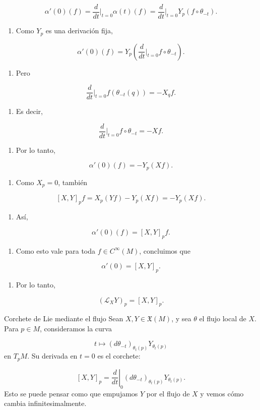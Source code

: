 \begin{bookproof}{}
\[
\alpha'(0)(f)=\frac{d}{dt}\bigg|_{t=0}\alpha(t)(f)=\frac{d}{dt}\bigg|_{t=0}Y_p(f\circ\theta_{-t}).
\]
\begin{enumerate}[start=33]
\item Como $Y_p$ es una derivación fija,
\end{enumerate}
\[
\alpha'(0)(f)=Y_p\left(\frac{d}{dt}\bigg|_{t=0}f\circ\theta_{-t}\right).
\]
\begin{enumerate}[start=34]
\item Pero
\end{enumerate}
\[
\frac{d}{dt}\bigg|_{t=0}f(\theta_{-t}(q))=-X_qf.
\]
\begin{enumerate}[start=35]
\item Es decir,
\end{enumerate}
\[
\frac{d}{dt}\bigg|_{t=0}f\circ\theta_{-t}=-Xf.
\]
\begin{enumerate}[start=36]
\item Por lo tanto,
\end{enumerate}
\[
\alpha'(0)(f)=-Y_p(Xf).
\]
\begin{enumerate}[start=37]
\item Como $X_p=0$, también
\end{enumerate}
\[
[X,Y]_pf=X_p(Yf)-Y_p(Xf)=-Y_p(Xf).
\]
\begin{enumerate}[start=38]
\item Así,
\end{enumerate}
\[
\alpha'(0)(f)=[X,Y]_pf.
\]
\begin{enumerate}[start=39]
\item Como esto vale para toda $f\in C^\infty(M)$, concluimos que
\end{enumerate}
\[
\alpha'(0)=[X,Y]_p.
\]
\begin{enumerate}[start=40]
\item Por lo tanto,
\end{enumerate}
\[
(\mathcal L_XY)_p=[X,Y]_p.
\]
\bookqed
\end{bookproof}
\begin{bookdefinition}{Corchete de Lie mediante el flujo}
Sean $X,Y\in\mathfrak X(M)$, y sea $\theta$ el flujo local de $X$. Para $p\in M$, consideramos la curva

\[
t\mapsto(d\theta_{-t})_{\theta_t(p)}Y_{\theta_t(p)}
\]
en $T_pM$. Su derivada en $t=0$ es el corchete:

\[
[X,Y]_p=\left.\frac{d}{dt}\right|_{0}(d\theta_{-t})_{\theta_t(p)}Y_{\theta_t(p)}.
\]
Esto se puede pensar como que empujamos $Y$ por el flujo de $X$ y vemos cómo cambia infinitesimalmente.

\end{bookdefinition}
